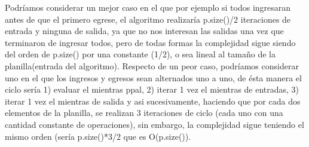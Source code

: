 \newline
Podríamos considerar un mejor caso en el que por ejemplo si  todos ingresaran antes de que el primero egrese, el algoritmo realizaría p.size()/2 iteraciones de entrada y ninguna de salida, ya que no nos interesan las salidas una vez que terminaron de ingresar todos, pero de todas formas la complejidad sigue siendo del orden de p.size() por una constante (1/2), o sea lineal al tamaño de la planilla(entrada del algoritmo).
\newline 
Respecto de un peor caso, podríamos considerar uno en el que los ingresos y egresos sean alternados uno a uno, de ésta manera el ciclo sería  1) evaluar el mientras ppal, 2)  iterar 1 vez  el mientras de entradas, 3) iterar 1 vez el mientras de salida  y asi sucesivamente, haciendo que  por cada dos elementos de la planilla, se realizan 3 iteraciones de ciclo (cada uno con una cantidad constante de operaciones), sin embargo, la complejidad sigue teniendo el mismo orden (sería p.size()*3/2 que es O(p.size()).


